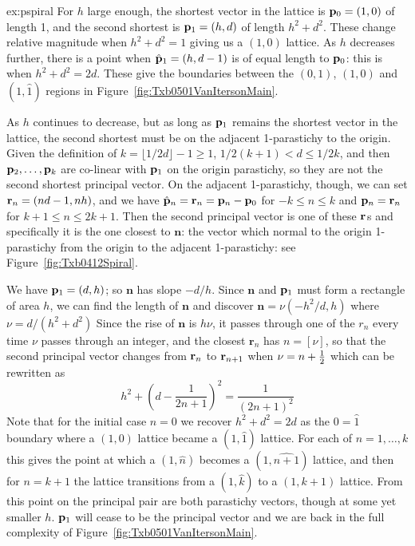 \begin{jAnswer}{ex:pspiral}
For $h$ large enough, 	the shortest vector in the lattice is  ${\mathbf p}_{0}=(1,0)$ 
of length 1, and the second shortest is  ${\mathbf p}_{1}=(h,d)$ of length $h^2+d^2$.
These change relative magnitude when $h^2+d^2=1$ giving us a $(1,0)$ lattice.
As $h$ decreases further, there is a point when  $\hat{\mathbf p}_{1}=(h,d-1)$ is of equal length to ${\mathbf p}_{0}$: this is when $h^2+d^2=2d$. These give the boundaries between the $(0,1)$, $(1,0)$ and $(1,\hat 1)$ regions in Figure~\ref{fig:Txb0501VanItersonMain}. 

As $h$ continues to decrease, but as long as ${\mathbf p}_{1}$ remains the shortest vector in the lattice, the second shortest
must be on the adjacent 1-parastichy to the origin. Given the definition of $k=\lfloor1/2d\rfloor-1\geq 1$, $1/2(k+1)<d\leq 1/2k$,  and then ${\mathbf p}_{2},\ldots,{\mathbf p}_{k}$ are co-linear with ${\mathbf p}_{1}$ on the origin parastichy, so they are not the second shortest principal vector. On the adjacent 1-parastichy, though, we can set $\mathbf{r}_{n}=  (nd-1,n h)$, and we have $\hat{\mathbf p}_{n}=\mathbf{r}_{n}={\mathbf p}_{n}-{\mathbf p}_{0}$ for $-k\leq n\leq k$ and ${\mathbf p}_{n}=\mathbf{r}_{n}$ for $k+1\leq n\leq 2k+1$. Then the second principal vector is one of these $\mathbf{r}_{}$s and specifically it is the one closest to $\mathbf{n}$: the vector which normal to the origin 1-parastichy from the origin to the adjacent 1-parastichy: see Figure~\ref{fig:Txb0412Spiral}.
%

We have ${\mathbf p}_{1}=(d,h)$; so $\mathbf{n}$  has slope $-d/h$. Since   $\mathbf{n}$ and ${\mathbf p}_{1}$
must form a rectangle of area $h$, we can find the length of  $\mathbf{n}$ and discover  $\mathbf{n} = \nu (-h^2 /d,h)$
where 
$
	\nu = 
	{d}/{(h^2+d^2)}
$
Since the rise of $\mathbf{n}$ is $h\nu$, it passes through one of the $r_n$ every time $\nu$ passes through an integer,
and the closest  $\mathbf{r}_n$ has $n=[\nu]$, so that the second principal vector changes from $\mathbf{r}_{n}$ to 
$\mathbf{r}_{n+1}$  when $\nu=n+\textstyle{\frac{1}{2}}$ which can be rewritten as 
\begin{equation}
{h^2+\left(d-\frac{1}{2n+1}\right)^2}=  \frac{1}{(2n+1)^2}
\end{equation}
Note that for the initial case $n=0$ we recover $h^2+d^2=2d$ as the $0=\hat{1}$ boundary where a $(1,0)$ lattice became a $(1,\hat 1)$ lattice. For each of $n=1,\ldots,k$ this gives the point at which a  $(1,\hat n)$ becomes a  $(1,\widehat {n+1})$ lattice, and then for $n=k+1$ the lattice transitions from a  $(1,\hat {k})$ to a $(1, {k+1})$ lattice.  From this point on the principal pair are both parastichy vectors, though at some yet smaller $h$.  ${\mathbf p}_{1}$ will cease to be the principal vector and we are back in the full complexity of Figure~\ref{fig:Txb0501VanItersonMain}.


\end{jAnswer}
